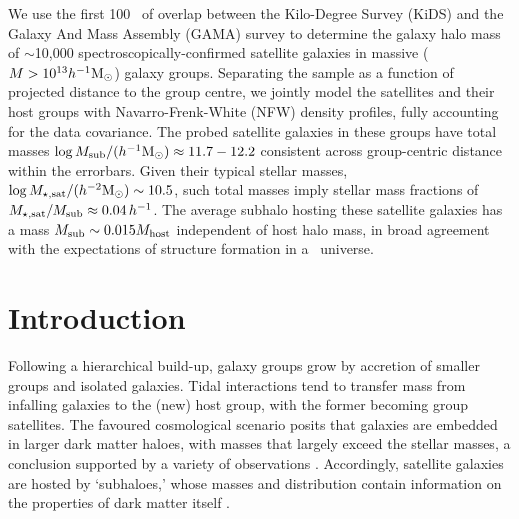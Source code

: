 \begin{small}
We use the first 100 \sqdeg\ of overlap between the Kilo-Degree Survey (KiDS) and the Galaxy And 
Mass Assembly (GAMA) survey to determine the galaxy halo mass of $\sim$10,000 
spectroscopically-confirmed satellite galaxies in massive ($M>10^{13}h^{-1}{\rm M}_\odot$) galaxy 
groups. Separating the sample as a function of projected distance to the group centre, we jointly 
model the satellites and their host groups with Navarro-Frenk-White (NFW) density profiles, fully 
accounting for the data covariance. The probed satellite galaxies in these groups have total masses 
$\log M_{\rm sub}/(h^{-1}{\rm M}_\odot)\approx11.7-12.2$ consistent across group-centric distance 
within the errorbars. Given their typical stellar masses, $\log M_{\rm \star,sat}/(h^{-2}{\rm 
M}_\odot)\sim10.5$, such total masses imply stellar mass fractions of $M_{\rm \star,sat}/M_{\rm 
sub}\approx0.04\,h^{-1}$. The average subhalo hosting these satellite galaxies has a mass $M_{\rm 
sub}\sim0.015M_{\rm host}$ independent of host halo mass, in broad agreement with the expectations 
of structure formation in a \lcdm\ universe.
\end{small}





\pagebreak


\section{Introduction}

Following a hierarchical build-up, galaxy groups grow by accretion of smaller groups and isolated 
galaxies. Tidal interactions tend to transfer mass from infalling galaxies to the (new) host 
group, with the former becoming group satellites. The favoured cosmological scenario posits that 
galaxies are embedded in larger dark matter haloes, with masses that largely exceed the stellar 
masses, a conclusion supported by a variety of observations \citep[see, e.g., the reviews 
by][]{trimble87,einasto13}. Accordingly, satellite galaxies are hosted by `subhaloes,' whose masses 
and distribution contain information on the properties of dark matter itself 
\citep[e.g.,][]{libeskind13}.

